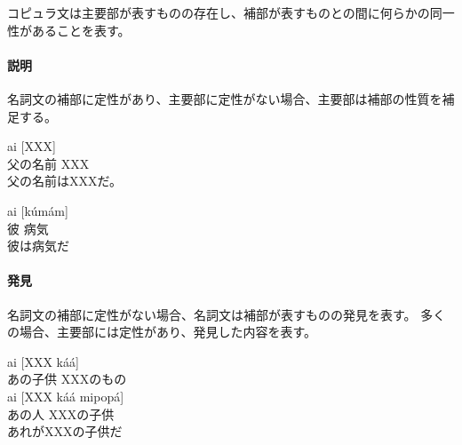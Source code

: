 コピュラ文は主要部が表すものの存在し、補部が表すものとの間に何らかの同一性があることを表す。

\paragraph{説明}
名詞文の補部に定性があり、主要部に定性がない場合、主要部は補部の性質を補足する。

\begin{exe}
    \ex \gll [u\'ak\'a ap\'a piku\'o] ai [XXX] \\
        父の名前 XXX \\
    \glt 父の名前はXXXだ。
\end{exe}
\begin{exe}
    \ex \gll [k\'ap\'a] ai [k\'um\'am] \\
        彼 病気 \\
    \glt 彼は病気だ
\end{exe}

\paragraph{発見}
名詞文の補部に定性がない場合、名詞文は補部が表すものの発見を表す。
多くの場合、主要部には定性があり、発見した内容を表す。

\begin{exe}
    \ex \gll [r\'i\'i mipop\'a] ai [XXX k\'a\'a] \\
        あの子供 XXXのもの \\
    \ex \gll [r\'i\'i ap\'a] ai [XXX k\'a\'a mipop\'a] \\
        あの人 XXXの子供 \\
    \glt あれがXXXの子供だ
\end{exe}